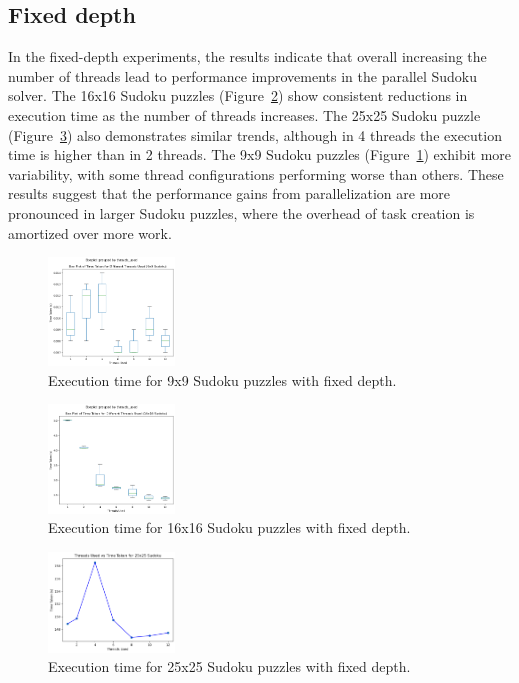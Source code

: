 \documentclass[a4paper,10pt]{article}
\begin{document}
\begin{multicols}{2}
\subsection{Fixed depth}

In the fixed-depth experiments, the results indicate that overall increasing the number of threads lead to performance improvements in the parallel Sudoku solver. The 16x16 Sudoku puzzles (Figure~\ref{fig:16x16_fixed_depth}) show consistent reductions in execution time as the number of threads increases. The 25x25 Sudoku puzzle (Figure~\ref{fig:25x25_fixed_depth}) also demonstrates similar trends, although in 4 threads the execution time is higher than in 2 threads. The 9x9 Sudoku puzzles (Figure~\ref{fig:9x9_fixed_depth}) exhibit more variability, with some thread configurations performing worse than others. These results suggest that the performance gains from parallelization are more pronounced in larger Sudoku puzzles, where the overhead of task creation is amortized over more work.

\begin{figure}[H]
    \centering
    \includegraphics[width=0.3\textwidth]{9x9_fixed_depth.png}
    \caption{Execution time for 9x9 Sudoku puzzles with fixed depth.}
    \label{fig:9x9_fixed_depth}
\end{figure}

\begin{figure}[H]
    \centering
    \includegraphics[width=0.3\textwidth]{16x16_fixed_depth.png}
    \caption{Execution time for 16x16 Sudoku puzzles with fixed depth.}
    \label{fig:16x16_fixed_depth}
\end{figure}

\begin{figure}[H]
    \centering
    \includegraphics[width=0.3\textwidth]{25x25_fixed_depth.png}
    \caption{Execution time for 25x25 Sudoku puzzles with fixed depth.}
    \label{fig:25x25_fixed_depth}
\end{figure}


\end{multicols}
\end{document}
